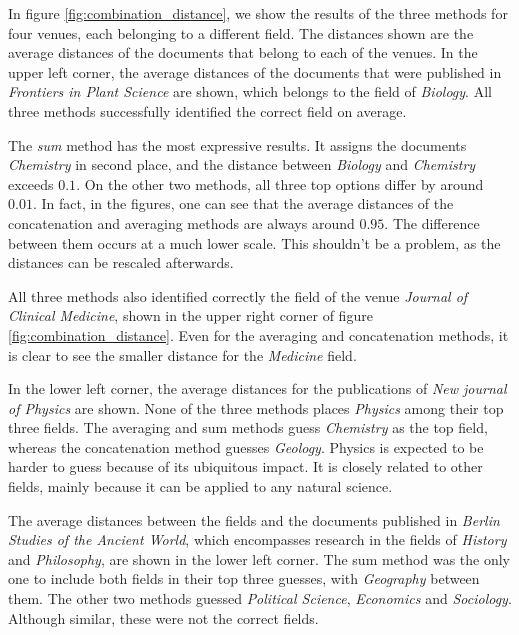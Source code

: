 In figure \ref{fig:combination_distance}, we show the results of the three methods for four venues, each belonging to a different field. The distances shown are the average distances of the documents that belong to each of the venues. In the upper left corner, the average distances of the documents that were published in \textit{Frontiers in Plant Science} are shown, which belongs to the field of \textit{Biology}. All three methods successfully identified the correct field on average.

The \textit{sum} method has the most expressive results. It assigns the documents \textit{Chemistry} in second place, and the distance between \textit{Biology} and \textit{Chemistry} exceeds $0.1$. On the other two methods, all three top options differ by around $0.01$. In fact, in the figures, one can see that the average distances of the concatenation and averaging methods are always around $0.95$. The difference between them occurs at a much lower scale. This shouldn't be a problem, as the distances can be rescaled afterwards.

All three methods also identified correctly the field of the venue \textit{Journal of Clinical Medicine}, shown in the upper right corner of figure \ref{fig:combination_distance}. Even for the averaging and concatenation methods, it is clear to see the smaller distance for the \textit{Medicine} field.

In the lower left corner, the average distances for the publications of \textit{New journal of Physics} are shown. None of the three methods places \textit{Physics} among their top three fields. The averaging and sum methods guess \textit{Chemistry} as the top field, whereas the concatenation method guesses \textit{Geology}. Physics is expected to be harder to guess because of its ubiquitous impact. It is closely related to other fields, mainly because it can be applied to any natural science.

The average distances between the fields and the documents published in \textit{Berlin Studies of the Ancient World}, which encompasses research in the fields of \textit{History} and \textit{Philosophy}, are shown in the lower left corner. The sum method was the only one to include both fields in their top three guesses, with \textit{Geography} between them. The other two methods guessed \textit{Political Science}, \textit{Economics} and \textit{Sociology}. Although similar, these were not the correct fields.
